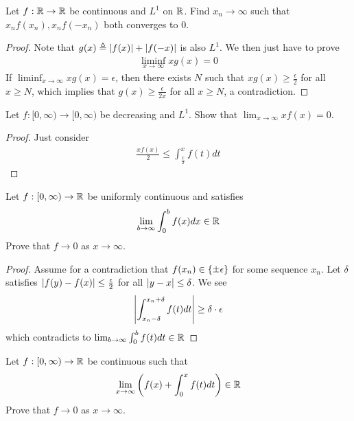 \documentclass{report}
\begin{document}
\begin{question}{}{}
Let $f:\mathbb{R}\rightarrow \mathbb{R}$ be continuous and $L^1$ on  $\mathbb{R}$. Find  $x_n \rightarrow \infty$ such that $x_nf(x_n),x_nf(-x_n)$ both converges to $0$. 
\end{question}
\begin{proof}
Note that $g(x)\triangleq \left|f(x)\right|+ \left|f(-x)\right|$ is also $L^1$. We then just have to prove 
\begin{align*}
  \liminf_{x\to\infty} xg(x)=0
\end{align*}
If $\liminf_{x\to\infty} xg(x)=\epsilon $, then there exists $N$ such that $xg(x)\geq \frac{\epsilon}{2}$ for all $x\geq N$, which implies that $g(x)\geq \frac{\epsilon }{2x}$ for all $x\geq N$, a contradiction.  
\end{proof}
\begin{question}{}{}
Let $f:[0,\infty)\rightarrow [0,\infty)$ be decreasing and $L^1$. Show that  $\lim_{x\to \infty}xf(x)=0$. 
\end{question}
\begin{proof}
Just consider 
\begin{align*}
\frac{xf(x)}{2}\leq \int_{\frac{x}{2}}^x f(t)dt
\end{align*}
\end{proof}
\begin{question}{}{}
Let $f:[0,\infty) \rightarrow \mathbb{R}$ be uniformly continuous and satisfies 
\begin{align*}
\lim_{b\to \infty} \int_0^b f(x)dx \in\mathbb{R}
\end{align*}
Prove that  $f\rightarrow 0$ as $x \rightarrow  \infty$.  
\end{question}
\begin{proof}
Assume for a contradiction that $f(x_n) \in \left\{ \pm \epsilon  \right\}$ for some sequence $x_n $. Let $\delta$ satisfies $\left|f(y)-f(x)\right|\leq \frac{\epsilon}{2}$ for all $\left|y-x\right|\leq \delta$.  We see 
\begin{align*}
  \left|\int_{x_n-\delta}^{x_n+\delta} f(t)dt \right|\geq \delta \cdot \epsilon 
\end{align*}
which contradicts to $\lim_{b\to \infty}\int_0^b f(t)dt\in\mathbb{R} $
\end{proof}
\begin{question}{}{}
Let $f:[0,\infty)\rightarrow \mathbb{R}$ be continuous such that 
\begin{align*}
\lim_{x\to \infty} \left(f(x)+ \int_0^x f(t)dt \right) \in\mathbb{R}
\end{align*}
Prove that $f\rightarrow 0$ as $x\rightarrow  \infty$. 
\end{question}
\end{document}
